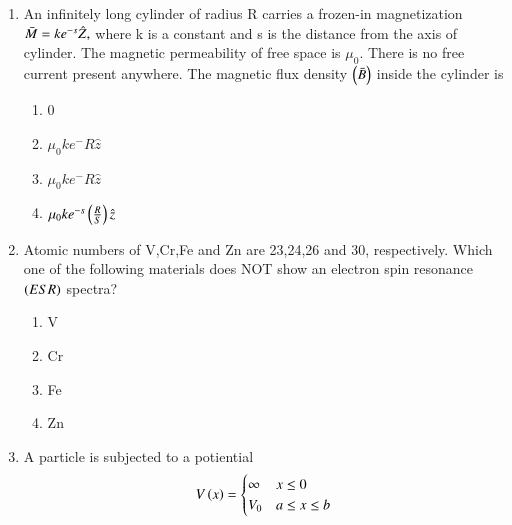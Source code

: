 \documentclass[journal,12pt,onecolumn]{IEEEtran}
\theoremstyle{remark}
\begin{document}
\begin{enumerate}
\begin{enumerate}
\item \begin{figure}[!ht]
\centering
\resizebox{0.2\textwidth}{!}{%

}%
\end{figure}
\item \begin{figure}[!ht]
\centering
\resizebox{0.2\textwidth}{!}{%

}%
\end{figure}
\item \begin{figure}[!ht]
\centering
\resizebox{0.2\textwidth}{!}{%

}%
\end{figure}
\item \begin{figure}[!ht]
\centering
\resizebox{0.2\textwidth}{!}{%

}%
\end{figure}
\end{enumerate}
\item An infinitely long cylinder of radius R carries a frozen-in magnetization $\Bar{M}=ke^{-s}\hat{Z},$ where k is a constant and s is the distance from the axis of cylinder. The magnetic permeability of free space is $\mu_{0}$. There is no free current present anywhere. The magnetic flux density $\left(\Bar{B}\right)$ inside the cylinder is
\begin{enumerate}
    \item 0
    \item $\mu_0ke^-R\hat{z}$
    \item $\mu_0ke^-R\hat{z}$
    \item $\mu_0ke^{-s}\left(\frac{R}{S}\right)\hat{z}$
\end{enumerate}
\item Atomic numbers of V,Cr,Fe and Zn are 23,24,26 and 30, respectively. Which one of the following materials does NOT show an electron spin resonance $\left(ESR\right)$ spectra?
\begin{enumerate}
    \item V
    \item Cr
    \item Fe
    \item Zn
\end{enumerate}
\item A particle is subjected to a potiential 
\[
V\left(x\right)=
\begin{cases}
\infty & x\leq 0\\
V_0 & a\leq x \leq b\\

\end{cases}\]
\end{enumerate}
\end{document}
